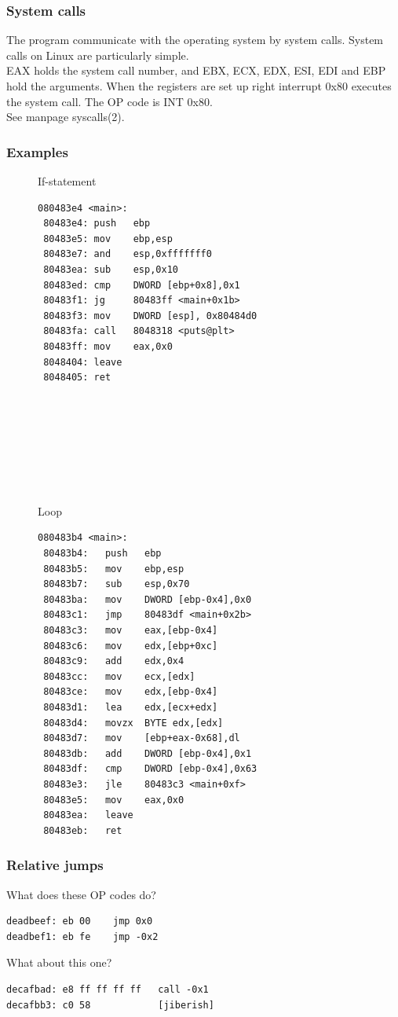\documentclass[slidestop,compress,mathserif, xcolor=table]{beamer}
\begin{document}
\begin{frame}
  \frametitle{System calls}

  The program communicate with the operating system by system calls. System
  calls on Linux are particularly simple.\\[1em]

  EAX holds the system call number, and EBX, ECX, EDX, ESI, EDI and EBP hold the
  arguments. When the registers are set up right interrupt 0x80 executes the
  system call. The OP code is INT 0x80.\\[1em]

  See manpage syscalls(2).
\end{frame}

\begin{frame}[fragile]
  \frametitle{Examples}

\tiny
\begin{figure}
\begin{multicols}{2}
If-statement
\begin{verbatim}
080483e4 <main>:
 80483e4: push   ebp
 80483e5: mov    ebp,esp
 80483e7: and    esp,0xfffffff0
 80483ea: sub    esp,0x10
 80483ed: cmp    DWORD [ebp+0x8],0x1
 80483f1: jg     80483ff <main+0x1b>
 80483f3: mov    DWORD [esp], 0x80484d0
 80483fa: call   8048318 <puts@plt>
 80483ff: mov    eax,0x0
 8048404: leave
 8048405: ret








\end{verbatim}
Loop
\begin{verbatim}
080483b4 <main>:
 80483b4:	push   ebp
 80483b5:	mov    ebp,esp
 80483b7:	sub    esp,0x70
 80483ba:	mov    DWORD [ebp-0x4],0x0
 80483c1:	jmp    80483df <main+0x2b>
 80483c3:	mov    eax,[ebp-0x4]
 80483c6:	mov    edx,[ebp+0xc]
 80483c9:	add    edx,0x4
 80483cc:	mov    ecx,[edx]
 80483ce:	mov    edx,[ebp-0x4]
 80483d1:	lea    edx,[ecx+edx]
 80483d4:	movzx  BYTE edx,[edx]
 80483d7:	mov    [ebp+eax-0x68],dl
 80483db:	add    DWORD [ebp-0x4],0x1
 80483df:	cmp    DWORD [ebp-0x4],0x63
 80483e3:	jle    80483c3 <main+0xf>
 80483e5:	mov    eax,0x0
 80483ea:	leave
 80483eb:	ret
\end{verbatim}
\end{multicols}
\end{figure}
\end{frame}

\begin{frame}[fragile]
  \frametitle{Relative jumps}

  What does these OP codes do?

\begin{verbatim}
deadbeef: eb 00    jmp 0x0
deadbef1: eb fe    jmp -0x2
\end{verbatim}

  What about this one?
\begin{verbatim}
decafbad: e8 ff ff ff ff   call -0x1
decafbb3: c0 58            [jiberish]
\end{verbatim}
\end{frame}
\end{document}

